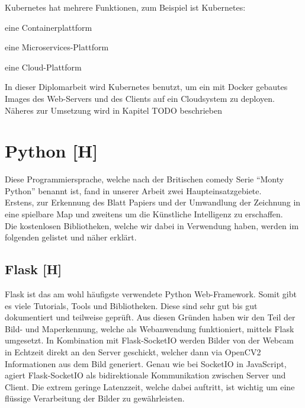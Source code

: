 Kubernetes hat mehrere Funktionen, zum Beispiel ist Kubernetes:
\begin{compactitem}
    \item eine Containerplattform
    \item eine Microservices-Plattform
    \item eine Cloud-Plattform
\end{compactitem}

In dieser Diplomarbeit wird Kubernetes benutzt, um ein mit Docker gebautes Images des Web-Servers und des Clients auf ein Cloudsystem zu deployen. Näheres zur Umsetzung wird in Kapitel TODO beschrieben

\newpage
\section{Python [H]}
Diese Programmiersprache, welche nach der Britischen comedy Serie ``Monty Python'' benannt ist,
fand in unserer Arbeit zwei Haupteinsatzgebiete. \\
Erstens, zur Erkennung des Blatt Papiers und der Umwandlung der Zeichnung in eine spielbare Map
und zweitens um die Künstliche Intelligenz zu erschaffen. \\
Die kostenlosen Bibliotheken, welche wir dabei in Verwendung haben, werden im folgenden gelistet und näher
erklärt.

\subsection{Flask [H]}
Flask ist das am wohl häufigste verwendete Python Web-Framework. Somit gibt es viele Tutorials,
Tools und Bibliotheken. Diese sind sehr gut bis gut dokumentiert und teilweise geprüft.
Aus diesen Gründen haben wir den Teil der Bild- und Maperkennung, welche
als Webanwendung funktioniert, mittels Flask umgesetzt. In Kombination mit Flask-SocketIO werden Bilder von der Webcam
in Echtzeit direkt an den Server geschickt, welcher dann via OpenCV2 Informationen aus dem Bild
generiert. Genau wie bei SocketIO in JavaScript, agiert Flask-SocketIO als bidirektionale
Kommunikation zwischen Server und Client. Die extrem geringe Latenzzeit, welche dabei auftritt,
ist wichtig um eine flüssige Verarbeitung der Bilder zu gewährleisten.

